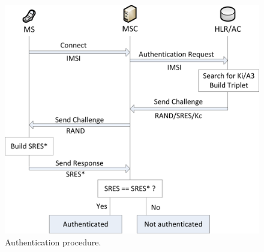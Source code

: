 \begin{figure}
\centering
\includegraphics{../Images/Authentication}
\caption{Authentication procedure.}
\label{fig:authentication}
\end{figure}

